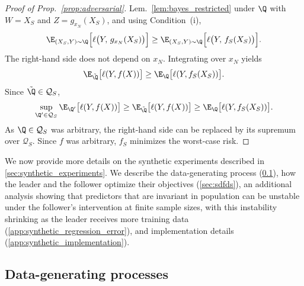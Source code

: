 \begin{proof}[Proof of Prop.~\ref{prop:adversarial}]
Lem.~\ref{lem:bayes_restricted} under $\Q$ with $W = X_S$ and
$Z = g_{x_N}(X_S)$, and using Condition~(i),
\begin{equation*}
  \E_{(X_S,Y) \sim \Q} \Big[\ell \big(Y,\, g_{x_N}(X_S)\big)\Big]
   \geq 
  \E_{(X_S,Y) \sim \Q} \Big[
    \ell \big(Y,\, f_S(X_S)\big)
  \Big].
\end{equation*}
The right-hand side does not depend on $x_N$. Integrating over $x_N$ yields
\begin{equation*}
  \E_{\tilde\Q} \big[\ell(Y, f(X))\big]
   \geq 
  \E_\Q \big[\ell(Y, f_S(X_S))\big].
\end{equation*}
Since $\tilde\Q \in \mathcal{Q}_S$,
$$
  \sup_{\Q' \in \mathcal{Q}_S}
    \E_{\Q'} \big[\ell(Y, f(X))\big]
   \geq 
  \E_{\tilde\Q} \big[\ell(Y, f(X))\big]
   \geq 
  \E_\Q \big[\ell(Y, f_S(X_S))\big].
$$
As $\Q \in \mathcal{Q}_S$ was arbitrary, the right-hand side can be
replaced by its supremum over $\mathcal{Q}_S$. Since
$f$ was arbitrary, $f_S$ minimizes the worst-case risk.
\end{proof}















\label{app:synthetic_details}



We now provide more details on the synthetic experiments described in \cref{sec:synthetic_experiments}. We describe the data-generating process (\cref{app:dgp}), how the leader and the follower optimize their objectives (\cref{sec:sdfds}), an additional analysis showing that predictors that are invariant in
population can be unstable under the follower's intervention at finite sample
sizes, with this instability shrinking as the leader receives more training data (\cref{app:synthetic_regression_error}), and implementation details (\cref{app:synthetic_implementation}).


\subsection{Data-generating processes}
\label{app:dgp}

